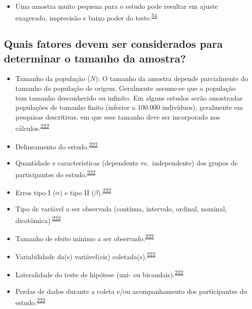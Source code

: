 \documentclass[
  a4paper,
]{book}
\providecommand{\tightlist}{%
  \setlength{\itemsep}{0pt}\setlength{\parskip}{0pt}}
\begin{document}
\begin{itemize}
\tightlist
\item
  Uma amostra muito pequena para o estudo pode resultar em ajuste exagerado, imprecisão e baixo poder do teste.\textsuperscript{\protect\hyperlink{ref-van2022a}{54}}
\end{itemize}

\hypertarget{quais-fatores-devem-ser-considerados-para-determinar-o-tamanho-da-amostra}{%
\subsection{Quais fatores devem ser considerados para determinar o tamanho da amostra?}\label{quais-fatores-devem-ser-considerados-para-determinar-o-tamanho-da-amostra}}

\begin{itemize}
\item
  Tamanho da população (\(N\)): O tamanho da amostra depende parcialmente do tamanho da população de origem. Geralmente assume-se que a população tem tamanho desconhecido ou infinito. Em alguns estudos serão amostradas populações de tamanho finito (inferior a 100.000 indivíduos), geralmente em pesquisas descritivas, em que esse tamanho deve ser incorporado nos cálculos.\textsuperscript{\protect\hyperlink{ref-rodruxedguezdeluxe1guila2014}{222}}
\item
  Delineamento do estudo.\textsuperscript{\protect\hyperlink{ref-rodruxedguezdeluxe1guila2014}{222}}
\item
  Quantidade e características (dependente vs.~independente) dos grupos de participantes do estudo.\textsuperscript{\protect\hyperlink{ref-rodruxedguezdeluxe1guila2014}{222}}
\item
  Erros tipo I (\(\alpha\)) e tipo II (\(\beta\)).\textsuperscript{\protect\hyperlink{ref-rodruxedguezdeluxe1guila2014}{222}}
\item
  Tipo de variável a ser observada (contínua, intervalo, ordinal, nominal, dicotômica).\textsuperscript{\protect\hyperlink{ref-rodruxedguezdeluxe1guila2014}{222}}
\item
  Tamanho de efeito mínimo a ser observado.\textsuperscript{\protect\hyperlink{ref-rodruxedguezdeluxe1guila2014}{222}}
\item
  Variabilidade da(s) variável(eis) coletada(s).\textsuperscript{\protect\hyperlink{ref-rodruxedguezdeluxe1guila2014}{222}}
\item
  Lateralidade do teste de hipótese (uni- ou bicaudais).\textsuperscript{\protect\hyperlink{ref-rodruxedguezdeluxe1guila2014}{222}}
\item
  Perdas de dados durante a coleta e/ou acompanhamento dos participantes do estudo.\textsuperscript{\protect\hyperlink{ref-rodruxedguezdeluxe1guila2014}{222}}
\end{itemize}
\end{document}
